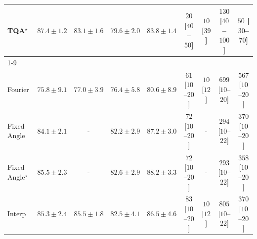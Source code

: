 \begin{tabular}{l|cccc|cccc|}
TQA$^\star$ & {\cellcolor[HTML]{004F2D}} \color[HTML]{F1F1F1} $87.4\pm 1.2$ & {\cellcolor[HTML]{208242}} \color[HTML]{F1F1F1} $83.1\pm 1.6$ & {\cellcolor[HTML]{4FB264}} \color[HTML]{F1F1F1} $79.6\pm 2.0$ & {\cellcolor[HTML]{177B3F}} \color[HTML]{F1F1F1} $83.8\pm 1.4$ & {\cellcolor[HTML]{FFF5F1}} \color[HTML]{000000} $20$ [$40$--$50$] & {\cellcolor[HTML]{FFF7F3}} \color[HTML]{000000} $10$ [$39$] & {\cellcolor[HTML]{FDDBD7}} \color[HTML]{000000} $130$ [$40$--$100$] & {\cellcolor[HTML]{FEEEEB}} \color[HTML]{000000} $50$ [$30$--$70$] \\
\cline{1-9}
\multicolumn{9}{c}{\rule{0pt}{8pt}SV} \\
\midrule
Fourier & {\cellcolor[HTML]{97B7D7}} \color[HTML]{000000} $75.8\pm 9.1$ & {\cellcolor[HTML]{80AED2}} \color[HTML]{F1F1F1} $77.0\pm 3.9$ & {\cellcolor[HTML]{8CB3D5}} \color[HTML]{000000} $76.4\pm 5.8$ & {\cellcolor[HTML]{308CBE}} \color[HTML]{F1F1F1} $80.6\pm 8.9$ & {\cellcolor[HTML]{FEEBE8}} \color[HTML]{000000} $61$ [$10$--$20$] & {\cellcolor[HTML]{FFF7F3}} \color[HTML]{000000} $10$ [$12$] & {\cellcolor[HTML]{7D0177}} \color[HTML]{F1F1F1} $699$ [$10$--$20$] & {\cellcolor[HTML]{C01588}} \color[HTML]{F1F1F1} $567$ [$10$--$20$] \\
Fixed Angle & {\cellcolor[HTML]{0566A0}} \color[HTML]{F1F1F1} $84.1\pm 2.1$ & {\cellcolor[HTML]{000000}} \color[HTML]{F1F1F1} {\cellcolor{white}} \color{black} - & {\cellcolor[HTML]{1278B4}} \color[HTML]{F1F1F1} $82.2\pm 2.9$ & {\cellcolor[HTML]{03456C}} \color[HTML]{F1F1F1} $87.2\pm 3.0$ & {\cellcolor[HTML]{FEE9E6}} \color[HTML]{000000} $72$ [$10$--$20$] & {\cellcolor[HTML]{000000}} \color[HTML]{F1F1F1} {\cellcolor{white}} \color{black} - & {\cellcolor[HTML]{FAA5B7}} \color[HTML]{000000} $294$ [$10$--$22$] & {\cellcolor[HTML]{F87EA9}} \color[HTML]{F1F1F1} $370$ [$10$--$20$] \\
Fixed Angle$^\star$ & {\cellcolor[HTML]{045A8D}} \color[HTML]{F1F1F1} $85.5\pm 2.3$ & {\cellcolor[HTML]{000000}} \color[HTML]{F1F1F1} {\cellcolor{white}} \color{black} - & {\cellcolor[HTML]{0A73B2}} \color[HTML]{F1F1F1} $82.6\pm 2.9$ & {\cellcolor[HTML]{023858}} \color[HTML]{F1F1F1} $88.2\pm 3.3$ & {\cellcolor[HTML]{FEE9E6}} \color[HTML]{000000} $72$ [$10$--$20$] & {\cellcolor[HTML]{000000}} \color[HTML]{F1F1F1} {\cellcolor{white}} \color{black} - & {\cellcolor[HTML]{FAA5B7}} \color[HTML]{000000} $293$ [$10$--$22$] & {\cellcolor[HTML]{F883AB}} \color[HTML]{F1F1F1} $358$ [$10$--$20$] \\
Interp & {\cellcolor[HTML]{045C90}} \color[HTML]{F1F1F1} $85.3\pm 2.4$ & {\cellcolor[HTML]{045A8D}} \color[HTML]{F1F1F1} $85.5\pm 1.8$ & {\cellcolor[HTML]{0D75B3}} \color[HTML]{F1F1F1} $82.5\pm 4.1$ & {\cellcolor[HTML]{034D79}} \color[HTML]{F1F1F1} $86.5\pm 4.6$ & {\cellcolor[HTML]{FEE6E3}} \color[HTML]{000000} $83$ [$10$--$20$] & {\cellcolor[HTML]{FFF7F3}} \color[HTML]{000000} $10$ [$12$] & {\cellcolor[HTML]{49006A}} \color[HTML]{F1F1F1} $805$ [$10$--$22$] & {\cellcolor[HTML]{F87EA9}} \color[HTML]{F1F1F1} $370$ [$10$--$20$] \\

\end{tabular}
